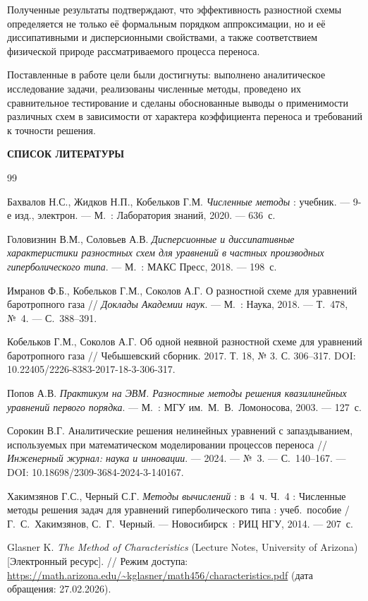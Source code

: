 \documentclass[a4paper,14pt]{extreport}
\newcommand{\specialchapter}[1]{%
	\clearpage
	\begin{center}
		\bfseries\MakeUppercase{#1}
	\end{center}
	\addcontentsline{toc}{chapter}{\MakeUppercase{#1}}
	\vspace{20pt}
}
\begin{document}
Полученные результаты подтверждают, что эффективность разностной схемы определяется не только её формальным порядком аппроксимации, но и её диссипативными и дисперсионными свойствами, а также соответствием физической природе рассматриваемого процесса переноса.

Поставленные в работе цели были достигнуты: выполнено аналитическое исследование задачи, реализованы численные методы, проведено их сравнительное тестирование и сделаны обоснованные выводы о применимости различных схем в зависимости от характера коэффициента переноса и требований к точности решения. 

\specialchapter{СПИСОК ЛИТЕРАТУРЫ}

\begingroup
\renewcommand{\chapter}[2]{} 
\begin{thebibliography}{99}
	\makeatletter \renewcommand{\@biblabel}[1]{#1.} \makeatother
	
	Бахвалов Н.С., Жидков Н.П., Кобельков Г.М.
	\textit{Численные методы} :
	учебник. —
	9-е изд., электрон. —
	М.~: Лаборатория знаний, 2020. —
	636~с.
	
	Головизнин В.М., Соловьев А.В.
	\textit{Дисперсионные и диссипативные характеристики разностных схем для уравнений в частных производных гиперболического типа}. —
	М.~: МАКС Пресс, 2018. —
	198~с.
	
	Имранов Ф.Б., Кобельков Г.М., Соколов А.Г.
	О разностной схеме для уравнений баротропного газа //
	\textit{Доклады Академии наук}. —
	М.~: Наука, 2018. —
	Т.~478, №~4. —
	С.~388--391.
	
	Кобельков Г.М., Соколов А.Г. 
	Об одной неявной разностной схеме для уравнений баротропного газа // 
	Чебышевский сборник. 2017. Т. 18, № 3. С. 306--317. 
	DOI: 10.22405/2226-8383-2017-18-3-306-317.
	
	Попов А.В.
	\textit{Практикум на ЭВМ. Разностные методы решения квазилинейных уравнений первого порядка}. —
	М.~: МГУ им.~М.~В.~Ломоносова, 2003. —
	127~с.
	
	Сорокин В.Г.
	Аналитические решения нелинейных уравнений с запаздыванием, используемых при математическом моделировании процессов переноса //
	\textit{Инженерный журнал: наука и инновации}. —
	2024. —
	№~3. —
	С.~140--167. —
	DOI: 10.18698/2309-3684-2024-3-140167.
	
	Хакимзянов Г.С., Черный С.Г.
	\textit{Методы вычислений} :
	в~4~ч.
	Ч.~4 :
	Численные методы решения задач для уравнений гиперболического типа :
	учеб.~пособие /
	Г.~С.~Хакимзянов, С.~Г.~Черный. —
	Новосибирск~: РИЦ НГУ, 2014. —
	207~с.
	
	Glasner K. 
	\textit{The Method of Characteristics} (Lecture Notes, University of Arizona) 
	[Электронный ресурс]. // 
	Режим доступа: \url{https://math.arizona.edu/~kglasner/math456/characteristics.pdf} 
	(дата обращения: 27.02.2026).
	
\end{thebibliography}
\end{document}
